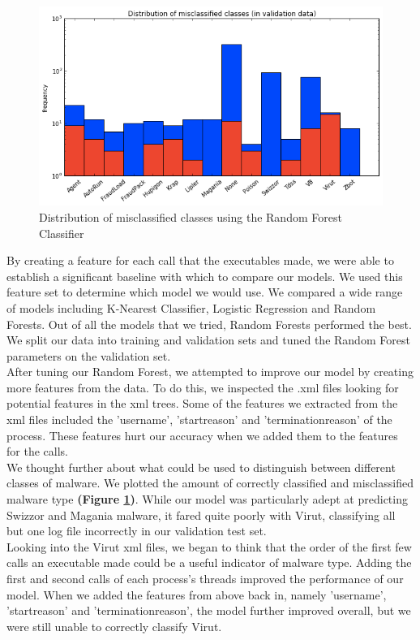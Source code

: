 \documentclass[11pt]{article}
\begin{document}
\begin{figure}[t]
\centering
\includegraphics[width=12cm]{misclassified_classes}
\caption{Distribution of misclassified classes using the Random Forest Classifier}
\label{fig:misclassified_classes}
\end{figure}

By creating a feature for each call that the executables made, we were able to establish a significant baseline with which to compare our models. We used this feature set to determine which model we would use. We compared a wide range of models including K-Nearest Classifier, Logistic Regression and Random Forests.  Out of all the models that we tried, Random Forests performed the best.  We split our data into training and validation sets and tuned the Random Forest parameters on the validation set.\\

After tuning our Random Forest, we attempted to improve our model by creating more features from the data.  To do this, we inspected the .xml files looking for potential features in the xml trees.  Some of the features we extracted from the xml files included the 'username', 'startreason' and 'terminationreason' of the process.  These features hurt our accuracy when we added them to the features for the calls. \\

We thought further about what could be used to distinguish between different classes of malware.  We plotted the amount of correctly classified and misclassified malware type \textbf{(Figure \ref{fig:misclassified_classes})}.  While our model was particularly adept at predicting Swizzor and Magania malware, it fared quite poorly with Virut, classifying all but one log file incorrectly in our validation test set.\\

Looking into the Virut xml files, we began to think that the order of the first few calls an executable made could be a useful indicator of malware type. Adding the first and second calls of each process's threads improved the performance of our model. When we added the features from above back in, namely 'username', 'startreason' and 'terminationreason', the model further improved overall, but we were still unable to correctly classify Virut. \\
\end{document}
